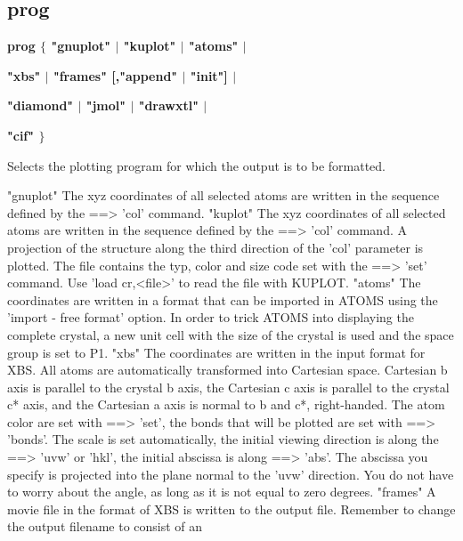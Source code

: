 \subsection*{prog}
{\bf prog $ \{$ "gnuplot" $| $ "kuplot" $| $ "atoms" $| $ \par }
{\bf        "xbs" $| $ "frames" [,"append" $| $ "init"] $| $ \par }
{\bf        "diamond" $| $ "jmol" $| $ "drawxtl" $| $ \par }
{\bf        "cif" $\} $ \par }
\par
\vspace{3pt}
Selects the plotting program for which the output is to be formatted. 
\par
\begin{MacVerbatim}
"gnuplot"  The xyz coordinates of all selected atoms are written in the
           sequence defined by the ==> 'col' command.
"kuplot"   The xyz coordinates of all selected atoms are written in the
           sequence defined by the ==> 'col' command. A projection of the
           structure along the third direction of the 'col' parameter is
           plotted. The file contains the typ, color and size code set
           with the ==> 'set' command. Use 'load cr,<file>' to read the
           file with KUPLOT.
"atoms"    The coordinates are written in a format that can be imported
           in ATOMS using the 'import - free format' option. In order
           to trick ATOMS into displaying the complete crystal, a
           new unit cell with the size of the crystal is used and the
           space group is set to P1.
"xbs"      The coordinates are written in the input format for XBS.
           All atoms are automatically transformed into Cartesian
           space. Cartesian b axis is parallel to the crystal b axis,
           the Cartesian c axis is parallel to the crystal c* axis,
           and the Cartesian a axis is normal to b and c*, right-handed.
           The atom color are set with ==> 'set', the bonds that
           will be plotted are set with ==> 'bonds'.
           The scale is set automatically, the initial viewing
           direction is along the ==> 'uvw' or 'hkl', the
           initial abscissa is along ==> 'abs'. The abscissa you
           specify is projected into the plane normal to the 'uvw'
           direction. You do not have to worry about the angle,
           as long as it is not equal to zero degrees.
"frames"   A movie file in the format of XBS is written to the
           output file.
           Remember to change the output filename to consist of an

\end{MacVerbatim}
